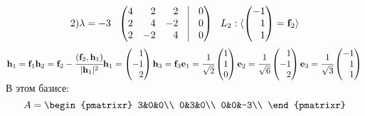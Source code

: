 $$
2) \lambda=-3 \:\:\: 
\begin{pmatrix*}[r]
 4 & 2 & 2 & \vrule & 0\\
 2 & 4 & -2 & \vrule & 0\\
 2 & -2 & 4 & \vrule & 0\\
\end{pmatrix*}
\:\:\:  
L_2:
 \langle \left(
\begin{matrix*}[r]
-1\\ 1\\ 1\\ 
\end{matrix*}
\right)=\textbf{f}_2 \rangle
$$
$
\textbf{h}_1=\textbf{f}_1\\
\textbf{h}_2=\textbf{f}_2 - \cfrac{(\textbf{f}_2,\textbf{h}_1)}{|\textbf{h}_1|^2} \textbf{h}_1=\left(
\begin{matrix*}[r]
1\\ -1\\ 2\\ 
\end{matrix*}
\right)\\
\textbf{h}_3=\textbf{f}_3\\
\textbf{e}_1 =\cfrac{1}{\sqrt{2}}
\begin{pmatrix*}[r]
1\\ 1\\ 0\\ 
\end{pmatrix*}
\textbf{e}_2 =\cfrac{1}{\sqrt{6}}
\begin{pmatrix*}[r]
1\\ -1\\ 2\\  
\end{pmatrix*}
\textbf{e}_3 =\cfrac{1}{\sqrt{3}}
\begin{pmatrix*}[r]
-1\\ 1\\ 1\\  
\end{pmatrix*}
 \\
$
В этом базисе:
$$
A = \begin{pmatrixr}
3&0&0\\
0&3&0\\
0&0&-3\\
\end{pmatrixr}
$$